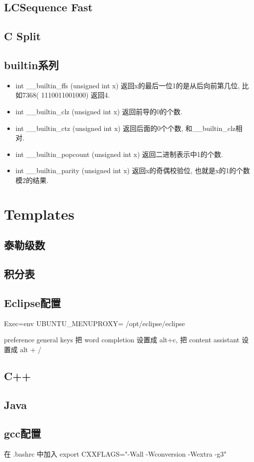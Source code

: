\documentclass[landscape, twocolumn, 8pt, a4paper, twoside]{extarticle}
\begin{document}
\subsection{LCSequence Fast}


\subsection{C Split}


\subsection{builtin系列}
\begin{itemize}
\item int \_\_builtin\_ffs (unsigned int x) 返回x的最后一位1的是从后向前第几位,  比如7368( 1110011001000) 返回4. 
\item int \_\_builtin\_clz (unsigned int x) 返回前导的0的个数. 
\item int \_\_builtin\_ctz (unsigned int x) 返回后面的0个个数, 和\_\_builtin\_clz相对. 
\item int \_\_builtin\_popcount (unsigned int x) 返回二进制表示中1的个数. 
\item int \_\_builtin\_parity (unsigned int x) 返回x的奇偶校验位, 也就是x的1的个数模2的结果. 
\end{itemize}

\section{Templates}
\subsection{泰勒级数}


\subsection{积分表}


\subsection{Eclipse配置}
Exec=env UBUNTU\_MENUPROXY= /opt/eclipse/eclipse

preference general keys 把 word completion 设置成 alt+c, 把 content assistant 设置成 alt + /

\subsection{C++}


\subsection{Java}


\subsection{gcc配置}
在 .bashrc 中加入 export CXXFLAGS="-Wall -Wconversion -Wextra -g3"
 
\end{document}
